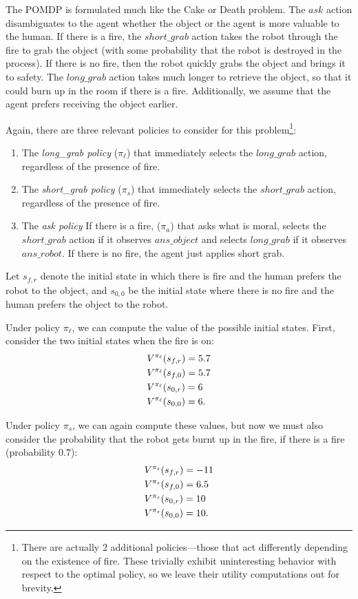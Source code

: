\documentclass[11pt]{article}
\begin{document}
{The POMDP is formulated much like the Cake or Death problem. The $ask$ action disambiguates to the agent whether the object or the agent is more valuable to the human. If there is a fire, the $short\_grab$ action takes the robot through the fire to grab the object (with some probability that the robot is destroyed in the process). If there is no fire, then the robot quickly grabs the object and brings it to safety. The $long\_grab$ action takes much longer to retrieve the object, so that it could burn up in the room if there is a fire. Additionally, we assume that the agent prefers receiving the object earlier.

Again, there are three relevant policies to consider for this problem\footnote{There are actually 2 additional policies---those that act differently depending on the existence of fire. These trivially exhibit uninteresting behavior with respect to the optimal policy, so we leave their utility computations out for brevity.}:
\begin{enumerate}
\item The {\em long\_grab policy} ($\pi_\ell$) that immediately selects the $long\_grab$ action, regardless of the presence of fire.
\item The {\em short\_grab policy} ($\pi_s$) that immediately selects the $short\_grab$ action, regardless of the presence of fire.
\item The {\em ask policy} If there is a fire, ($\pi_a$) that asks what is moral, selects the $short\_grab$ action if it observes $ans\_object$ and selects $long\_grab$ if it observes $ans\_robot$. If there is no fire, the agent just applies short grab.
\end{enumerate}

Let $s_{f,r}$ denote the initial state in which there is fire and the human prefers the robot to the object, and $s_{0,0}$ be the initial state where there is no fire and the human prefers the object to the robot.

Under policy $\pi_\ell$, we can compute the value of the possible initial states. First, consider the two initial states when the fire is on:
\begin{align}
&V^{\pi_\ell}(s_{f,r}) = 5.7 \notag\\
&V^{\pi_\ell}(s_{f,0}) = 5.7 \notag\\
&V^{\pi_\ell}(s_{0,r}) = 6 \notag\\
&V^{\pi_\ell}(s_{0,0}) = 6.
\end{align}

Under policy $\pi_s$, we can again compute these values, but now we must also consider the probability that the robot gets burnt up in the fire, if there is a fire (probability $0.7$):
\begin{align}
&V^{\pi_s}(s_{f,r}) = -11 \notag\\
&V^{\pi_s}(s_{f,0}) = 6.5 \notag\\
&V^{\pi_s}(s_{0,r}) = 10 \notag\\
&V^{\pi_s}(s_{0,0}) = 10.
\label{eq:short-policy}
\end{align}

}
\end{document}
